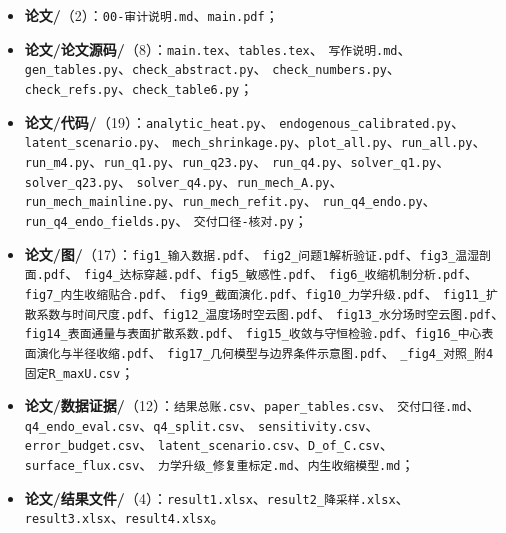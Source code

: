 \documentclass[12pt,a4paper]{ctexart}
\numberwithin{equation}{section}
\begin{document}
{\raggedright
\newcommand{\fsep}{、\allowbreak}
\begin{itemize}
  \item \textbf{论文/}（2）：\texttt{00-审计说明.md}\fsep \texttt{main.pdf}；
  \item \textbf{论文/论文源码/}（8）：\texttt{main.tex}\fsep \texttt{tables.tex}\fsep
        \texttt{写作说明.md}\fsep \texttt{gen\_tables.py}\fsep \texttt{check\_abstract.py}\fsep
        \texttt{check\_numbers.py}\fsep \texttt{check\_refs.py}\fsep \texttt{check\_table6.py}；
  \item \textbf{论文/代码/}（19）：\texttt{analytic\_heat.py}\fsep
        \texttt{endogenous\_calibrated.py}\fsep \texttt{latent\_scenario.py}\fsep
        \texttt{mech\_shrinkage.py}\fsep \texttt{plot\_all.py}\fsep \texttt{run\_all.py}\fsep
        \texttt{run\_m4.py}\fsep \texttt{run\_q1.py}\fsep \texttt{run\_q23.py}\fsep
        \texttt{run\_q4.py}\fsep \texttt{solver\_q1.py}\fsep \texttt{solver\_q23.py}\fsep
        \texttt{solver\_q4.py}\fsep \texttt{run\_mech\_A.py}\fsep
        \texttt{run\_mech\_mainline.py}\fsep \texttt{run\_mech\_refit.py}\fsep
        \texttt{run\_q4\_endo.py}\fsep \texttt{run\_q4\_endo\_fields.py}\fsep
        \texttt{交付口径-核对.py}；
  \item \textbf{论文/图/}（17）：\texttt{fig1\_输入数据.pdf}\fsep
        \texttt{fig2\_问题1解析验证.pdf}\fsep \texttt{fig3\_温湿剖面.pdf}\fsep
        \texttt{fig4\_达标穿越.pdf}\fsep \texttt{fig5\_敏感性.pdf}\fsep
        \texttt{fig6\_收缩机制分析.pdf}\fsep \texttt{fig7\_内生收缩贴合.pdf}\fsep
        \texttt{fig9\_截面演化.pdf}\fsep \texttt{fig10\_力学升级.pdf}\fsep
        \texttt{fig11\_扩散系数与时间尺度.pdf}\fsep \texttt{fig12\_温度场时空云图.pdf}\fsep
        \texttt{fig13\_水分场时空云图.pdf}\fsep \texttt{fig14\_表面通量与表面扩散系数.pdf}\fsep
        \texttt{fig15\_收敛与守恒检验.pdf}\fsep \texttt{fig16\_中心表面演化与半径收缩.pdf}\fsep
        \texttt{fig17\_几何模型与边界条件示意图.pdf}\fsep
        \texttt{\_fig4\_对照\_附4固定R\_maxU.csv}；
  \item \textbf{论文/数据证据/}（12）：\texttt{结果总账.csv}\fsep \texttt{paper\_tables.csv}\fsep
        \texttt{交付口径.md}\fsep \texttt{q4\_endo\_eval.csv}\fsep \texttt{q4\_split.csv}\fsep
        \texttt{sensitivity.csv}\fsep \texttt{error\_budget.csv}\fsep
        \texttt{latent\_scenario.csv}\fsep \texttt{D\_of\_C.csv}\fsep \texttt{surface\_flux.csv}\fsep
        \texttt{力学升级\_修复重标定.md}\fsep \texttt{内生收缩模型.md}；
  \item \textbf{论文/结果文件/}（4）：\texttt{result1.xlsx}\fsep \texttt{result2\_降采样.xlsx}\fsep
        \texttt{result3.xlsx}\fsep \texttt{result4.xlsx}。
\end{itemize}}
\end{document}
